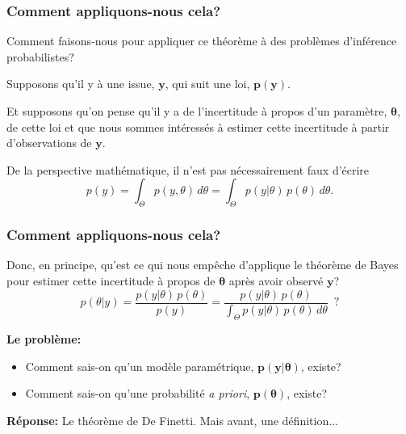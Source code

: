\documentclass{beamer}
\begin{document}
\begin{frame}
    \frametitle{Comment appliquons-nous cela?}
    Comment faisons-nous pour appliquer ce théorème à des problèmes 
    d'inférence probabilistes?

    \pause

    \vfill

    Supposons qu'il y à une issue, $\boldsymbol{y}$, qui suit une loi, $\boldsymbol{p(y)}$.

    \pause

    \vfill

    Et supposons qu'on pense qu'il y a de l'incertitude à propos d'un paramètre, $\boldsymbol{\theta}$,
    de cette loi et que nous sommes intéressés à estimer cette incertitude à partir d'observations de $\boldsymbol{y}$.

    \pause

    \vfill
    
    De la perspective mathématique, il n'est pas nécessairement faux d'écrire
    \[p(y) = \int_{\Theta} p(y, \theta) \, d\theta = \int_{\Theta} p(y | \theta) \, p(\theta) \, d\theta.\]

\end{frame}


\begin{frame}
    \frametitle{Comment appliquons-nous cela?}
    Donc, en principe, qu'est ce qui nous empêche d'applique le théorème de Bayes
    pour estimer cette incertitude à propos de $\boldsymbol{\theta}$ après avoir
    observé $\boldsymbol{y}$?
    \[p(\theta | y) = \frac{p(y | \theta) \, p(\theta)}{p(y)} =
      \frac{p(y | \theta) \, p(\theta)}{\int_{\Theta} p(y | \theta) \, p(\theta) \, d\theta} \, \, \, \textrm{?}\]
    
    \pause

    \vfill

    \textbf{Le problème:}
    \begin{itemize}
      \item Comment sais-on qu'un modèle paramétrique, $\boldsymbol{p(y | \theta)}$, existe?
      \pause
      \item Comment sais-on qu'une probabilité \emph{a priori}, $\boldsymbol{p(\theta)}$, existe?
    \end{itemize}

    \vfill

    \pause

    \textbf{Réponse:} Le théorème de De Finetti. \pause Mais avant, une définition...
\end{frame}
\end{document}
